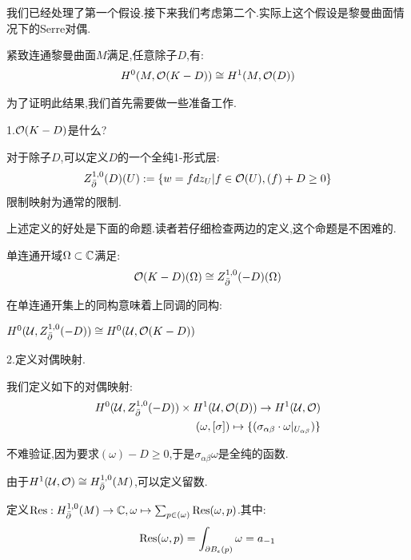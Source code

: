 我们已经处理了第一个假设.接下来我们考虑第二个.实际上这个假设是黎曼曲面情况下的Serre对偶.
\begin{theorem}
	紧致连通黎曼曲面$M$满足,任意除子$D$,有:
	\begin{align*}
		H^0(M,\mathcal{O}(K-D))\cong H^1(M,\mathcal{O}(D))
	\end{align*}
\end{theorem}
为了证明此结果,我们首先需要做一些准备工作.

1.$\mathcal{O}(K-D)$是什么?

对于除子$D$,可以定义$D$的一个全纯1-形式层:
\begin{align*}
	Z^{1,0}_{\bar{\partial}}(D)(U):=\{w=fdz_{U}|f\in \mathcal{O}(U),(f)+D\geq 0\}
\end{align*}
限制映射为通常的限制.

上述定义的好处是下面的命题.读者若仔细检查两边的定义,这个命题是不困难的.
\begin{proposition}
	单连通开域$\Omega \subset \mathbb{C}$满足:
	\begin{align*}
		\mathcal{O}(K-D)(\Omega)\cong Z^{1,0}_{\bar{\partial}}(-D)(\Omega)
	\end{align*}
\end{proposition}

在单连通开集上的同构意味着上同调的同构:
\begin{corollary}
	$H^0(\mathcal{U},Z^{1,0}_{\bar{\partial}}(-D))\cong H^0(\mathcal{U},\mathcal{O}(K-D))$
\end{corollary}

2.定义对偶映射.
\begin{definition}
	我们定义如下的对偶映射:
	\begin{align*}
		H^0(\mathcal{U},Z^{1,0}_{\bar{\partial}}(-D)) \times H^1(\mathcal{U},\mathcal{O}(D)) \to H^1(\mathcal{U},\mathcal{O}) \\
		(\omega,[\sigma]) \mapsto \{(\sigma_{\alpha\beta} \cdot \omega|_{U_{\alpha\beta}})\}
	\end{align*}
\end{definition}

不难验证,因为要求$(\omega)-D\geq 0$,于是$\sigma_{\alpha\beta}\omega$是全纯的函数.

由于$H^1(\mathcal{U},\mathcal{O})\cong H^{1,0}_{\bar{\partial}}(M)$,可以定义留数.
\begin{definition}
定义$\mathrm{Res}:H^{1,0}_{\bar{\partial}}(M) \to \mathbb{C},\omega \mapsto \sum_{p\in (\omega)}\mathrm{Res}(\omega,p)$.其中:
\begin{align*}
	\mathrm{Res}(\omega,p)=\int_{\partial B_{\epsilon}(p)}\omega=a_{-1}
\end{align*}
\end{definition}

